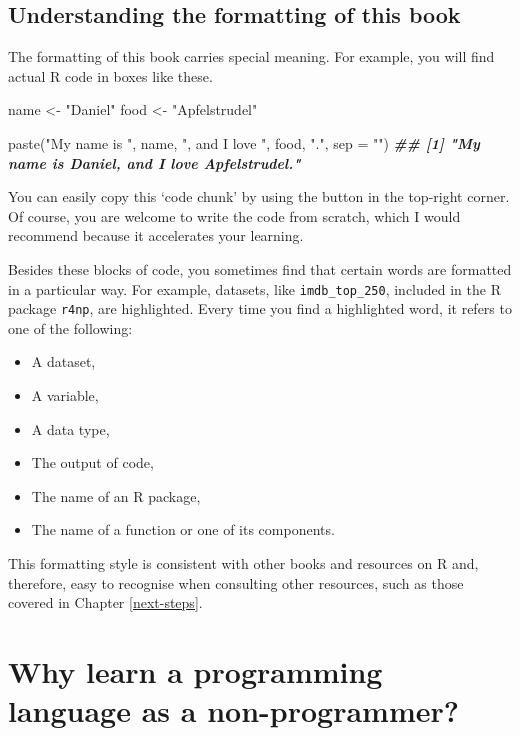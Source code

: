 \documentclass[
]{book}
\newenvironment{Shaded}{\begin{snugshade}}{\end{snugshade}}
\newcommand{\AttributeTok}[1]{\textcolor[rgb]{0.77,0.63,0.00}{#1}}
\newcommand{\DocumentationTok}[1]{\textcolor[rgb]{0.56,0.35,0.01}{\textbf{\textit{#1}}}}
\newcommand{\FunctionTok}[1]{\textcolor[rgb]{0.00,0.00,0.00}{#1}}
\newcommand{\NormalTok}[1]{#1}
\newcommand{\OtherTok}[1]{\textcolor[rgb]{0.56,0.35,0.01}{#1}}
\newcommand{\StringTok}[1]{\textcolor[rgb]{0.31,0.60,0.02}{#1}}
\begin{document}
\hypertarget{formatting-of-this-book}{%
\section{Understanding the formatting of this book}\label{formatting-of-this-book}}

The formatting of this book carries special meaning. For example, you will find actual R code in boxes like these.

\begin{Shaded}
\begin{Highlighting}[]
\NormalTok{name }\OtherTok{\textless{}{-}} \StringTok{"Daniel"}
\NormalTok{food }\OtherTok{\textless{}{-}} \StringTok{"Apfelstrudel"}

\FunctionTok{paste}\NormalTok{(}\StringTok{"My name is "}\NormalTok{, name, }\StringTok{", and I love "}\NormalTok{, food, }\StringTok{"."}\NormalTok{, }\AttributeTok{sep =} \StringTok{""}\NormalTok{)}
\DocumentationTok{\#\# [1] "My name is Daniel, and I love Apfelstrudel."}
\end{Highlighting}
\end{Shaded}

You can easily copy this `code chunk' by using the button in the top-right corner. Of course, you are welcome to write the code from scratch, which I would recommend because it accelerates your learning.

Besides these blocks of code, you sometimes find that certain words are formatted in a particular way. For example, datasets, like \texttt{imdb\_top\_250}, included in the R package \texttt{r4np}, are highlighted. Every time you find a highlighted word, it refers to one of the following:

\begin{itemize}
\item
  A dataset,
\item
  A variable,
\item
  A data type,
\item
  The output of code,
\item
  The name of an R package,
\item
  The name of a function or one of its components.
\end{itemize}

This formatting style is consistent with other books and resources on R and, therefore, easy to recognise when consulting other resources, such as those covered in Chapter \ref{next-steps}.

\hypertarget{why-learn-a-programming-language-as-a-non-programmer}{%
\chapter{Why learn a programming language as a non-programmer?}\label{why-learn-a-programming-language-as-a-non-programmer}}
\end{document}
